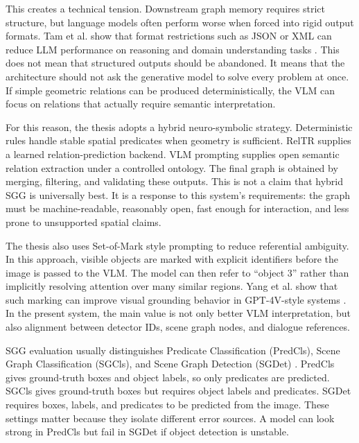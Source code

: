 This creates a technical tension. Downstream graph memory requires strict structure, but language models often perform worse when forced into rigid output formats. Tam et al. show that format restrictions such as JSON or XML can reduce LLM performance on reasoning and domain understanding tasks \cite{tam_let_2024}. This does not mean that structured outputs should be abandoned. It means that the architecture should not ask the generative model to solve every problem at once. If simple geometric relations can be produced deterministically, the VLM can focus on relations that actually require semantic interpretation.

For this reason, the thesis adopts a hybrid neuro-symbolic strategy. Deterministic rules handle stable spatial predicates when geometry is sufficient. RelTR supplies a learned relation-prediction backend. VLM prompting supplies open semantic relation extraction under a controlled ontology. The final graph is obtained by merging, filtering, and validating these outputs. This is not a claim that hybrid SGG is universally best. It is a response to this system's requirements: the graph must be machine-readable, reasonably open, fast enough for interaction, and less prone to unsupported spatial claims.

The thesis also uses Set-of-Mark style prompting to reduce referential ambiguity. In this approach, visible objects are marked with explicit identifiers before the image is passed to the VLM. The model can then refer to \enquote{object 3} rather than implicitly resolving attention over many similar regions. Yang et al. show that such marking can improve visual grounding behavior in GPT-4V-style systems \cite{yang_set-of-mark_2023}. In the present system, the main value is not only better VLM interpretation, but also alignment between detector IDs, scene graph nodes, and dialogue references.

SGG evaluation usually distinguishes Predicate Classification (PredCls), Scene Graph Classification (SGCls), and Scene Graph Detection (SGDet) \cite{zhu_scene_2022}. PredCls gives ground-truth boxes and object labels, so only predicates are predicted. SGCls gives ground-truth boxes but requires object labels and predicates. SGDet requires boxes, labels, and predicates to be predicted from the image. These settings matter because they isolate different error sources. A model can look strong in PredCls but fail in SGDet if object detection is unstable.


